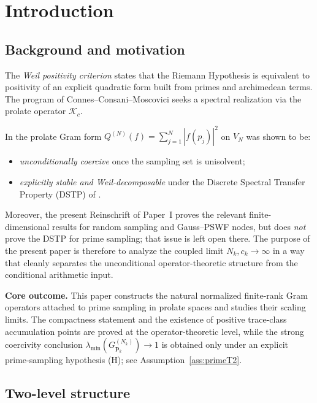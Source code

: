 \documentclass[12pt,a4paper]{amsart}
\theoremstyle{definition}
\newcommand{\Kop}{\mathcal{K}_c}
\newcommand{\GVMk}{G^{(N_k)}_{\mathbf{p}_k}}
\begin{document}
\maketitle
\tableofcontents

\section{Introduction}\label{sec:intro}

\subsection{Background and motivation}

The \emph{Weil positivity criterion} \cite{Weil1952,Bombieri2000}
states that the Riemann Hypothesis is equivalent to positivity of an
explicit quadratic form built from primes and archimedean terms.
The program of Connes--Consani--Moscovici \cite{CCM_PNAS2022,CCM2025}
seeks a spectral realization via the prolate operator $\Kop$.

In \cite{PaperI} the prolate Gram form
$Q^{(N)}(f)=\sum_{j=1}^N|f(p_j)|^2$ on $V_N$ was shown to be:
\begin{itemize}
\item \emph{unconditionally coercive} once the sampling set is unisolvent;
\item \emph{explicitly stable and Weil-decomposable} under the
Discrete Spectral Transfer Property (DSTP) of \cite{PaperI}.
\end{itemize}
Moreover, the present Reinschrift of Paper~I proves the relevant finite-dimensional
results for random sampling and Gauss--PSWF nodes, but does \emph{not} prove
the DSTP for prime sampling; that issue is left open there.
The purpose of the present paper is therefore to analyze the coupled limit
\(N_k,c_k\to\infty\) in a way that cleanly separates the unconditional
operator-theoretic structure from the conditional arithmetic input.

\medskip
\noindent\textbf{Core outcome.}
This paper constructs the natural normalized finite-rank Gram operators
attached to prime sampling in prolate spaces and studies their scaling limits.
The compactness statement and the existence of positive trace-class
accumulation points are proved at the operator-theoretic level, while the
strong coercivity conclusion $\lambda_{\min}(\GVMk)\to1$ is obtained only
under an explicit prime-sampling hypothesis \textup{(H)}; see
Assumption~\ref{ass:primeT2}.

\subsection{Two-level structure}
\end{document}
